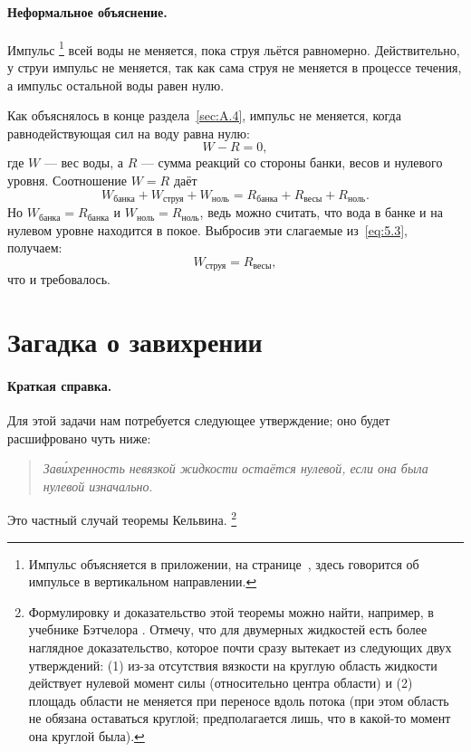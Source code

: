 \paragraph{Неформальное объяснение.}
Импульс%
\footnote{Импульс объясняется в приложении, на странице~\pageref{Импульс}, здесь говорится об импульсе в вертикальном направлении.}
всей воды не меняется, пока струя льётся равномерно.
Действительно, у струи импульс не меняется, так как сама струя не меняется в процессе течения, а импульс остальной воды равен нулю.

Как объяснялось в конце раздела~\ref{sec:A.4},
импульс не меняется, когда равнодействующая сил на воду равна нулю:
\[W-R=0,\]
где $W$ --- вес воды, а $R$ --- сумма реакций со стороны банки, весов и нулевого уровня.
Соотношение $W=R$ даёт
\begin{equation}
W_{\text{банка}}+W_{\text{струя}}+W_{\text{ноль}}
= R_{\text{банка}}+R_{\text{весы}}+R_{\text{ноль}}.
\label{eq:5.3}
\end{equation}
Но $W_{\text{банка}}=R_{\text{банка}}$ и $W_{\text{ноль}}=R_{\text{ноль}}$, ведь можно считать, что вода в банке и на нулевом уровне находится в покое.
Выбросив эти слагаемые из~\eqref{eq:5.3}, получаем:
\[
W_{\text{струя}}=R_{\text{весы}},
\]
что и требовалось.

\section{Загадка о завихрении}

\paragraph{Краткая справка.}
Для этой задачи нам потребуется следующее утверждение;
оно будет расшифровано чуть ниже:
\begin{quote}
\emph{Зав\'{и}хренность невязкой жидкости остаётся нулевой, если она была нулевой изначально}.
\end{quote}
Это частный случай теоремы Кельвина.%
\footnote{Формулировку и доказательство этой теоремы можно найти, например, в учебнике Бэтчелора \cite{batchelor1967}.
Отмечу, что для двумерных жидкостей есть более наглядное доказательство, которое почти сразу вытекает из следующих двух утверждений: (1) из-за отсутствия вязкости на круглую область жидкости действует нулевой момент силы (относительно центра области) и (2) площадь области не меняется при переносе вдоль потока (при этом область не обязана оставаться круглой; предполагается лишь, что в какой-то момент она круглой была).}

